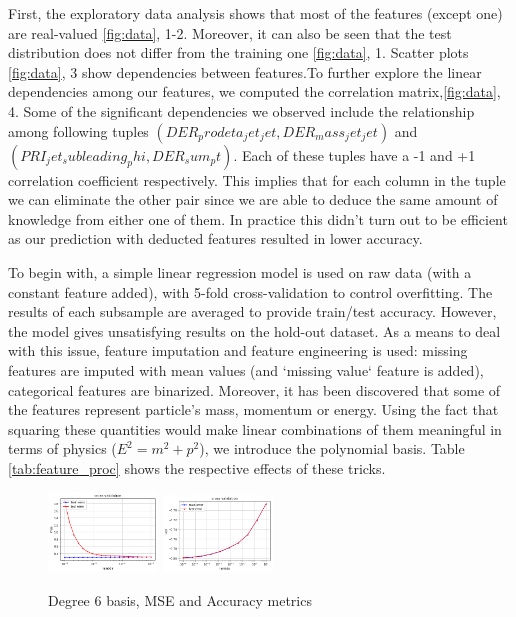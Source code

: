 \documentclass[10pt,conference,compsocconf]{IEEEtran}
\begin{document}
First, the exploratory data analysis shows that most of the features (except one) are real-valued \ref{fig:data}, 1-2. Moreover, it can also be seen that the test distribution does not differ from the training one \ref{fig:data}, 1. Scatter plots \ref{fig:data}, 3 show dependencies between features.To further explore the linear dependencies among our features, we computed the correlation matrix,\ref{fig:data}, 4.
Some of the significant dependencies we observed include the relationship among following tuples $(DER_prodeta_jet_jet ,DER_mass_jet_jet)$  and $( PRI_jet_subleading_phi,DER_sum_pt).$
Each of these tuples have a -1 and +1 correlation coefficient respectively. This implies that for each column in the tuple we can eliminate the other pair since we are able to deduce the same amount of knowledge from either one of them. In practice this didn't turn out to be efficient as our prediction with deducted features resulted in lower accuracy. 

To begin with, a simple linear regression model is used on raw data (with a constant feature added), with 5-fold cross-validation to control overfitting. The results of each subsample are averaged to provide train/test accuracy. However, the model gives unsatisfying results on the hold-out dataset. As a means to deal with this issue, feature imputation and feature engineering is used: missing features are imputed with mean values (and `missing value` feature is added), categorical features are binarized. Moreover, it has been discovered that some of the features represent particle's mass, momentum or energy. Using the fact that squaring these quantities would make linear combinations of them meaningful in terms of physics ($E^2=m^2+p^2$), we introduce the polynomial basis. Table \ref{tab:feature_proc} shows the respective effects of these tricks.

\begin{figure}[!htb]
	\centering \includegraphics[width=110px]{linear_5}
	\centering \includegraphics[width=110px]{ridge_accuracy_deg6}
	\caption{Degree 6 basis, MSE and Accuracy metrics}
	\label{fig:deg6}
\end{figure}
\end{document}
